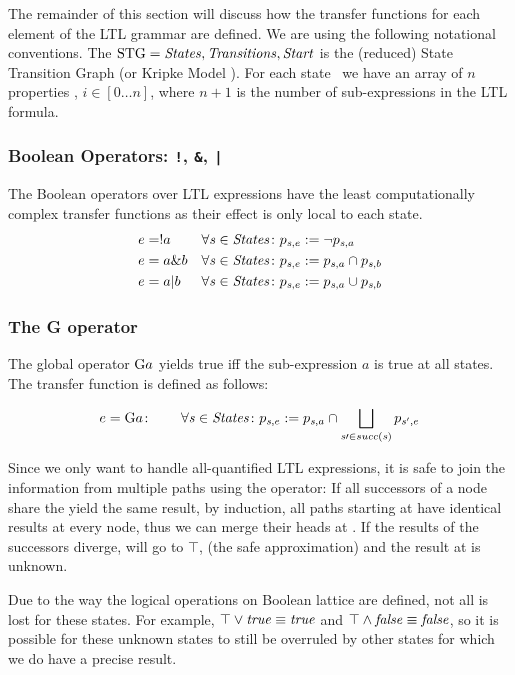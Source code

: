 The remainder of this section will discuss how the transfer functions
for each element of the LTL grammar are defined. We are using the
following notational conventions. The
$\mathrm{STG}={\mathit{States},\mathit{Transitions},\mathit{Start}}$ is the
(reduced) State Transition Graph (or Kripke Model
\citep[pg. 27ff]{Clarke1999}). For each state \state\ we have an array of $n$
properties , $i \in [0\dots n]$, where $n+1$ is the number of
sub-expressions in the LTL formula.

\subsubsection{Boolean Operators: \texttt{!}, \texttt{\&}, \texttt{|}}
The Boolean operators over LTL expressions have the least
computationally complex transfer functions as their effect is only
local to each state.
\begin{align*}
e &= !a  & \forall\mathit{s}\in\mathit{States}\colon p_{\mathit{s},e} &:= \neg p_{\mathit{s},a}\\
e &= a \& b & \forall\mathit{s}\in\mathit{States}\colon p_{\mathit{s},e} &:= p_{\mathit{s},a} \cap p_{\mathit{s},b}\\
e &= a | b & \forall\mathit{s}\in\mathit{States}\colon p_{\mathit{s},e} &:= p_{\mathit{s},a} \cup p_{\mathit{s},b}\\
\end{align*}

\subsubsection{The G operator}
The global operator $\mathrm{G} a$ yields true iff the sub-expression $a$ is
true at all states. The transfer function is defined as follows:

\[ e = \mathrm{G} a\colon\qquad\forall\mathit{s}\in\mathit{States}\colon p_{\mathit{s},e}
:=p_{\mathit{s},a}\cap\bigsqcup_{\mathit{s}\prime\in succ(\mathit{s})}{p_{\mathit{s}',e}} \]

Since we only want to handle all-quantified LTL expressions, it is
safe to join the information from multiple paths using the \lub
operator: If all successors of a node share the yield the same result,
by induction, all paths starting at \state have identical results at
every node, thus we can merge their heads at \state. If the results of
the successors diverge, \state will go to $\top$, (the safe
approximation) and the result at \state is unknown.

Due to the way the logical operations on Boolean lattice are defined,
not all is lost for these states. For example, $\top \vee \mathit{true}
\equiv \mathit{true}$ and $\top \wedge \mathit{false} \equiv \mathit{false}$, so it is
possible for these unknown states to still be overruled by other
states for which we do have a precise result.

